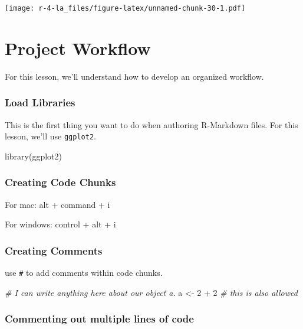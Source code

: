 \documentclass[
]{book}
\newenvironment{Shaded}{\begin{snugshade}}{\end{snugshade}}
\newcommand{\CommentTok}[1]{\textcolor[rgb]{0.56,0.35,0.01}{\textit{#1}}}
\newcommand{\DecValTok}[1]{\textcolor[rgb]{0.00,0.00,0.81}{#1}}
\newcommand{\FunctionTok}[1]{\textcolor[rgb]{0.00,0.00,0.00}{#1}}
\newcommand{\NormalTok}[1]{#1}
\newcommand{\OtherTok}[1]{\textcolor[rgb]{0.56,0.35,0.01}{#1}}
\newcommand{\SpecialCharTok}[1]{\textcolor[rgb]{0.00,0.00,0.00}{#1}}
\begin{document}
\texttt{[image: r-4-la\_files/figure-latex/unnamed-chunk-30-1.pdf]}

\hypertarget{project-workflow}{%
\chapter{Project Workflow}\label{project-workflow}}

For this lesson, we'll understand how to develop an organized workflow.

\hypertarget{load-libraries}{%
\subsection{Load Libraries}\label{load-libraries}}

This is the first thing you want to do when authoring R-Markdown files. For this lesson, we'll use \texttt{ggplot2}.

\begin{Shaded}
\begin{Highlighting}[]
\FunctionTok{library}\NormalTok{(ggplot2)}
\end{Highlighting}
\end{Shaded}

\hypertarget{creating-code-chunks}{%
\subsection{Creating Code Chunks}\label{creating-code-chunks}}

For mac: alt + command + i

For windows: control + alt + i

\hypertarget{creating-comments}{%
\subsection{Creating Comments}\label{creating-comments}}

use \texttt{\#} to add comments within code chunks.

\begin{Shaded}
\begin{Highlighting}[]
\CommentTok{\# I can write anything here about our object a.}
\NormalTok{a }\OtherTok{\textless{}{-}} \DecValTok{2} \SpecialCharTok{+} \DecValTok{2} \CommentTok{\# this is also allowed}
\end{Highlighting}
\end{Shaded}

\hypertarget{commenting-out-multiple-lines-of-code}{%
\subsection{Commenting out multiple lines of code}\label{commenting-out-multiple-lines-of-code}}
\end{document}
